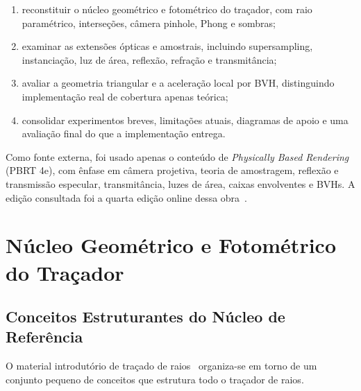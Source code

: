 \documentclass[portuguese]{sbcreviews-2025}%
\newcommand{\pbrtbook}{\emph{Physically Based Rendering} (PBRT 4e)}
\begin{document}
\begin{enumerate}
    \item reconstituir o núcleo geométrico e fotométrico do traçador, com raio paramétrico, interseções, câmera pinhole, Phong e sombras;
    \item examinar as extensões ópticas e amostrais, incluindo supersampling, instanciação, luz de área, reflexão, refração e transmitância;
    \item avaliar a geometria triangular e a aceleração local por BVH, distinguindo implementação real de cobertura apenas teórica;
    \item consolidar experimentos breves, limitações atuais, diagramas de apoio e uma avaliação final do que a implementação entrega.
\end{enumerate}

Como fonte externa, foi usado apenas o conteúdo de \pbrtbook, com ênfase em câmera projetiva, teoria de amostragem, reflexão e transmissão especular, transmitância, luzes de área, caixas envolventes e BVHs. A edição consultada foi a quarta edição online dessa obra~\citep{pharr2023pbrt}.

\section{Núcleo Geométrico e Fotométrico do Traçador}
\label{sec:slide4}

\subsection{Conceitos Estruturantes do Núcleo de Referência}
\label{sec:slide4-conceitos}

O material introdutório de traçado de raios~\citep{inf2608slides04} organiza-se em torno de um conjunto pequeno de conceitos que estrutura todo o traçador de raios.
\end{document}
